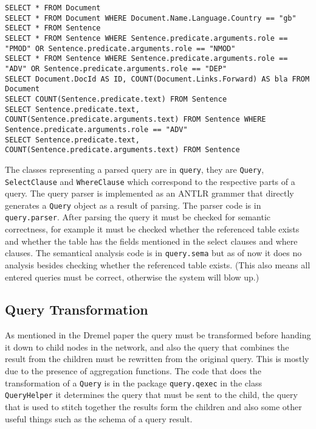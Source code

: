 \begin{lstlisting}[basicstyle=\scriptsize\ttfamily,float=htpb,label={lst:queries},caption={Some example queries that can be processed by Presslufthammer.}]
SELECT * FROM Document
SELECT * FROM Document WHERE Document.Name.Language.Country == "gb"
SELECT * FROM Sentence
SELECT * FROM Sentence WHERE Sentence.predicate.arguments.role == "PMOD" OR Sentence.predicate.arguments.role == "NMOD"
SELECT * FROM Sentence WHERE Sentence.predicate.arguments.role == "ADV" OR Sentence.predicate.arguments.role == "DEP"
SELECT Document.DocId AS ID, COUNT(Document.Links.Forward) AS bla FROM Document
SELECT COUNT(Sentence.predicate.text) FROM Sentence
SELECT Sentence.predicate.text, COUNT(Sentence.predicate.arguments.text) FROM Sentence WHERE Sentence.predicate.arguments.role == "ADV"
SELECT Sentence.predicate.text, COUNT(Sentence.predicate.arguments.text) FROM Sentence
\end{lstlisting}

The classes representing a parsed query are in \texttt{query}, they
are \texttt{Query}, \texttt{SelectClause} and \texttt{WhereClause} which
correspond to the respective parts of a query.
The query parser is implemented as an ANTLR \cite{antlr} grammer that directly
generates a \texttt{Query} object as a result of parsing. The parser code
is in \texttt{query.parser}. After parsing the query it must be checked
for semantic correctness, for example it must be checked whether the
referenced table exists and whether the table has the fields mentioned
in the select clauses and where clauses. The semantical analysis code
is in \texttt{query.sema} but as of now it does no analysis besides checking
whether the referenced table exists. (This also means all entered queries
must be correct, otherwise the system will blow up.)

\subsection{Query Transformation}
As mentioned in the Dremel paper \cite{melnik2010dremel} the query must
be transformed before handing it down to child nodes in the network,
and also the query that combines the result from the children must be
rewritten from the original query. This is mostly due to the presence
of aggregation functions. The code that does the transformation of a
\texttt{Query} is in the package \texttt{query.qexec} in the class
\texttt{QueryHelper} it determines the query that must be sent to the child,
the query that is used to stitch together the results form the children
and also some other useful things such as the schema of a query result.

